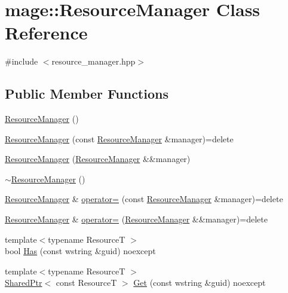 \hypertarget{classmage_1_1_resource_manager}{}\section{mage\+:\+:Resource\+Manager Class Reference}
\label{classmage_1_1_resource_manager}


{\ttfamily \#include $<$resource\+\_\+manager.\+hpp$>$}

\subsection*{Public Member Functions}
\begin{DoxyCompactItemize}
\item 
\hyperlink{classmage_1_1_resource_manager_a0ff509899a9fbef2096c60b3d3d80bd5}{Resource\+Manager} ()
\item 
\hyperlink{classmage_1_1_resource_manager_ac93f3ab65a9f45539b5a0221ebc197fe}{Resource\+Manager} (const \hyperlink{classmage_1_1_resource_manager}{Resource\+Manager} \&manager)=delete
\item 
\hyperlink{classmage_1_1_resource_manager_a243bf757dc9f90cfaf57cb9d5f42349f}{Resource\+Manager} (\hyperlink{classmage_1_1_resource_manager}{Resource\+Manager} \&\&manager)
\item 
\hyperlink{classmage_1_1_resource_manager_ad4bed85d3656f90072c5d47f50618add}{$\sim$\+Resource\+Manager} ()
\item 
\hyperlink{classmage_1_1_resource_manager}{Resource\+Manager} \& \hyperlink{classmage_1_1_resource_manager_ab0ca87429aaded525d03320dabd5cc67}{operator=} (const \hyperlink{classmage_1_1_resource_manager}{Resource\+Manager} \&manager)=delete
\item 
\hyperlink{classmage_1_1_resource_manager}{Resource\+Manager} \& \hyperlink{classmage_1_1_resource_manager_ac301d52cd5d6418013458f8090e19c88}{operator=} (\hyperlink{classmage_1_1_resource_manager}{Resource\+Manager} \&\&manager)=delete
\item 
{\footnotesize template$<$typename ResourceT $>$ }\\bool \hyperlink{classmage_1_1_resource_manager_aa6900b8af5f17f791a551dc2d4ee35e7}{Has} (const wstring \&guid) noexcept
\item 
{\footnotesize template$<$typename ResourceT $>$ }\\\hyperlink{namespacemage_a1e01ae66713838a7a67d30e44c67703e}{Shared\+Ptr}$<$ const ResourceT $>$ \hyperlink{classmage_1_1_resource_manager_a2888fcd54840af47d7ebf6fee8a9d56c}{Get} (const wstring \&guid) noexcept

\end{DoxyCompactItemize}
